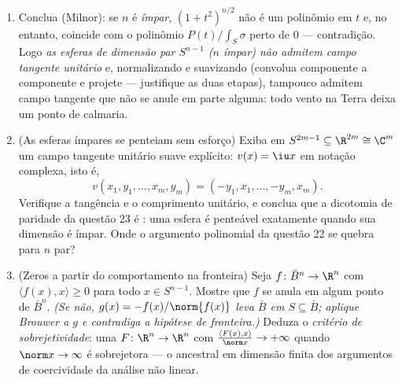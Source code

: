 \begin{problem}
\begin{enumerate}[resume]
\[        \qquad\text{com o sinal } + \text{ para } t
        \]
        (a  é preservada por  a partir de
        $t = 0$).
  \item Conclua (Milnor): se $n$ é \emph{ímpar}, $(1 +
        t^2)^{n/2}$ não é um
        polinômio em $t$ e, no entanto, coincide com o polinômio
        $P(t)/\int_S\sigma$ perto de $0$ --- contradição. Logo \emph{as esferas de
        dimensão par $S^{n-1}$ ($n$ ímpar) não admitem campo tangente
        unitário} e, normalizando e suavizando (convolua componente a
        componente e projete --- justifique as duas etapas), tampouco
        admitem campo tangente  que não se anule em parte
        alguma: todo vento na Terra deixa um ponto de calmaria.

  \item (As esferas ímpares se penteiam sem esforço) Exiba em $S^{2m-1}
        \subseteq \R^{2m} \cong \C^m$ um
        campo tangente unitário suave explícito: $v(x) = \iu x$ em notação
        complexa, isto é,
        \[
        v(x_1, y_1, \dots, x_m, y_m) =
        (-y_1, x_1, \dots, -y_m, x_m) .
        \]
        Verifique a tangência e o comprimento unitário, e conclua que a
        dicotomia de paridade da questão 23 é : uma esfera é
        penteável exatamente quando sua dimensão é ímpar. Onde o
        argumento polinomial da questão 22 se quebra para $n$ par?
  \item (Zeros a partir do comportamento na fronteira) Seja $f \colon \bar
        B^n \to \R^n$
         com $\langle f(x),
        x\rangle \geq 0$ para todo $x \in S^{n-1}$. Mostre que $f$ se anula em
        algum ponto de $\bar B^n$. \emph{(Se não, $g(x) = -f(x)/\norm{f(x)}$ leva $\bar B$
         em $S \subseteq \bar B$; aplique Brouwer a $g$ e contradiga a
        hipótese de fronteira.)} Deduza o \emph{critério de
        sobrejetividade}: uma  $F\colon\R^n\to\R^n$ com $\frac{\langle F(x), x\rangle}{\norm x} \to
        +\infty$ quando
        $\norm x \to \infty$ é sobrejetora --- o ancestral em dimensão finita dos
        argumentos de coercividade da análise não linear.
\end{enumerate}
\end{problem}
